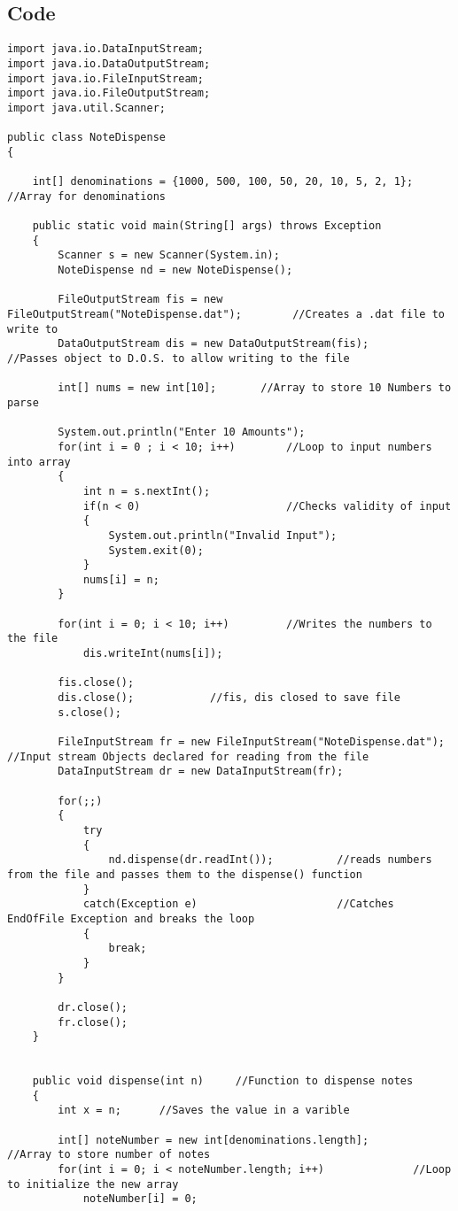 \documentclass[ProgramminAssignment.tex]{subfiles}
\begin{document}
\subsection{Code}
\begin{lstlisting}
import java.io.DataInputStream;
import java.io.DataOutputStream;
import java.io.FileInputStream;
import java.io.FileOutputStream;
import java.util.Scanner;

public class NoteDispense
{

	int[] denominations = {1000, 500, 100, 50, 20, 10, 5, 2, 1};	//Array for denominations
	
	public static void main(String[] args) throws Exception
	{
		Scanner s = new Scanner(System.in);
		NoteDispense nd = new NoteDispense();
		
		FileOutputStream fis = new FileOutputStream("NoteDispense.dat");		//Creates a .dat file to write to
		DataOutputStream dis = new DataOutputStream(fis);						//Passes object to D.O.S. to allow writing to the file
	
		int[] nums = new int[10];		//Array to store 10 Numbers to parse
		
		System.out.println("Enter 10 Amounts");
		for(int i = 0 ; i < 10; i++)		//Loop to input numbers into array
		{
			int n = s.nextInt();
			if(n < 0)						//Checks validity of input
			{
				System.out.println("Invalid Input");
				System.exit(0);
			}
			nums[i] = n;
		}
		
		for(int i = 0; i < 10; i++)			//Writes the numbers to the file
			dis.writeInt(nums[i]);
		
		fis.close();
		dis.close();			//fis, dis closed to save file
		s.close();
		
		FileInputStream fr = new FileInputStream("NoteDispense.dat");		//Input stream Objects declared for reading from the file
		DataInputStream dr = new DataInputStream(fr);
		
		for(;;)
		{
			try
			{
				nd.dispense(dr.readInt());			//reads numbers from the file and passes them to the dispense() function
			}
			catch(Exception e)						//Catches EndOfFile Exception and breaks the loop
			{
				break;
			}
		}
		
		dr.close();
		fr.close();
	}

	
	public void dispense(int n)		//Function to dispense notes
	{
		int x = n;		//Saves the value in a varible
		
		int[] noteNumber = new int[denominations.length];		//Array to store number of notes
		for(int i = 0; i < noteNumber.length; i++)				//Loop to initialize the new array
			noteNumber[i] = 0;
		

\end{lstlisting}
\end{document}
